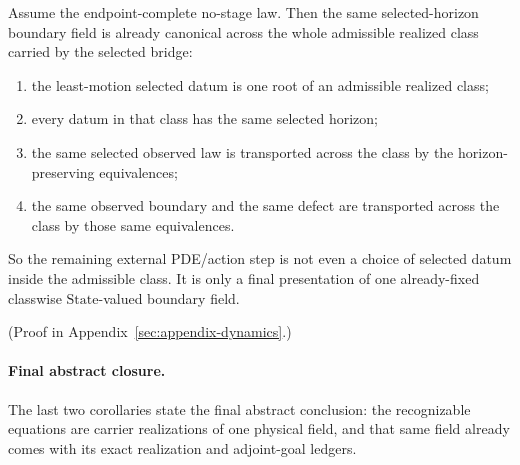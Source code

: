 \begin{corollary}
\label{cor:endpoint-complete-no-stage-law-already-yields-one-classwise-unified-boundary-field}
Assume the endpoint-complete no-stage law. Then the same selected-horizon
boundary field is already canonical across the whole admissible realized class
carried by the selected bridge:
\begin{enumerate}[label=(\roman*), leftmargin=2em, itemsep=0.2em]
\item the least-motion selected datum is one root of an admissible realized
      class;
\item every datum in that class has the same selected horizon;
\item the same selected observed law is transported across the class by the
      horizon-preserving equivalences;
\item the same observed boundary and the same defect are transported across
      the class by those same equivalences.
\end{enumerate}
So the remaining external PDE/action step is not even a choice of selected
datum inside the admissible class. It is only a final presentation of one
already-fixed classwise \(\mathrm{State}\)-valued boundary field.
\end{corollary}

(Proof in Appendix~\ref{sec:appendix-dynamics}.)

\paragraph{Final abstract closure.}
The last two corollaries state the final abstract conclusion:
the recognizable equations are carrier realizations of one physical field, and
that same field already comes with its exact realization and adjoint-goal ledgers.

